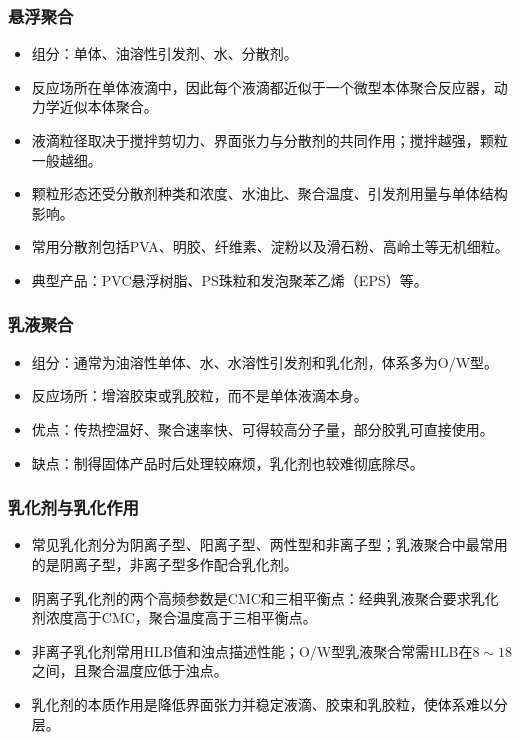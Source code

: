 ﻿\documentclass[12pt,a4paper]{article}
\begin{document}
\subsubsection{悬浮聚合}
\begin{itemize}
  \item 组分：单体、油溶性引发剂、水、分散剂。
  \item 反应场所在单体液滴中，因此每个液滴都近似于一个微型本体聚合反应器，动力学近似本体聚合。
  \item 液滴粒径取决于搅拌剪切力、界面张力与分散剂的共同作用；搅拌越强，颗粒一般越细。
  \item 颗粒形态还受分散剂种类和浓度、水油比、聚合温度、引发剂用量与单体结构影响。
  \item 常用分散剂包括PVA、明胶、纤维素、淀粉以及滑石粉、高岭土等无机细粒。
  \item 典型产品：PVC悬浮树脂、PS珠粒和发泡聚苯乙烯（EPS）等。
\end{itemize}

\subsubsection{乳液聚合}
\begin{itemize}
  \item 组分：通常为油溶性单体、水、水溶性引发剂和乳化剂，体系多为O/W型。
  \item 反应场所：增溶胶束或乳胶粒，而不是单体液滴本身。
  \item 优点：传热控温好、聚合速率快、可得较高分子量，部分胶乳可直接使用。
  \item 缺点：制得固体产品时后处理较麻烦，乳化剂也较难彻底除尽。
\end{itemize}

\subsubsection{乳化剂与乳化作用}
\begin{itemize}
  \item 常见乳化剂分为阴离子型、阳离子型、两性型和非离子型；乳液聚合中最常用的是阴离子型，非离子型多作配合乳化剂。
  \item 阴离子乳化剂的两个高频参数是CMC和三相平衡点：经典乳液聚合要求乳化剂浓度高于CMC，聚合温度高于三相平衡点。
  \item 非离子乳化剂常用HLB值和浊点描述性能；O/W型乳液聚合常需HLB在$8\sim18$之间，且聚合温度应低于浊点。
  \item 乳化剂的本质作用是降低界面张力并稳定液滴、胶束和乳胶粒，使体系难以分层。
\end{itemize}
\end{document}
